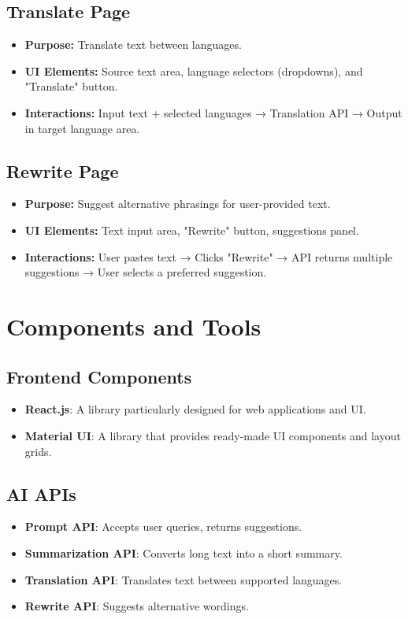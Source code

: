 \documentclass{article}
\begin{document}
\subsection{Translate Page}
\begin{itemize}
    \item \textbf{Purpose:} Translate text between languages.
    \item \textbf{UI Elements:} Source text area, language selectors (dropdowns), and "Translate" button.
    \item \textbf{Interactions:} Input text + selected languages → Translation API → Output in target language area.
\end{itemize}

\subsection{Rewrite Page}
\begin{itemize}
    \item \textbf{Purpose:} Suggest alternative phrasings for user-provided text.
    \item \textbf{UI Elements:} Text input area, "Rewrite" button, suggestions panel.
    \item \textbf{Interactions:} User pastes text → Clicks "Rewrite" → API returns multiple suggestions → User selects a preferred suggestion.
\end{itemize}

\section{Components and Tools}
\subsection{Frontend Components}
\begin{itemize}
    \item \textbf{React.js}: A library particularly designed for web applications and UI.
    \item \textbf{Material UI}: A library that provides ready-made UI components and layout grids.
\end{itemize}

\subsection{AI APIs}
\begin{itemize}
    \item \textbf{Prompt API}: Accepts user queries, returns suggestions.
    \item \textbf{Summarization API}: Converts long text into a short summary.
    \item \textbf{Translation API}: Translates text between supported languages.
    \item \textbf{Rewrite API}: Suggests alternative wordings.
\end{itemize}
\end{document}
